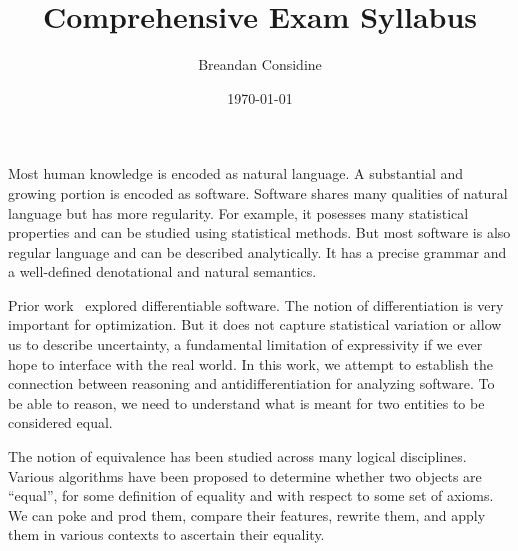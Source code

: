 \documentclass[11pt]{article}
\title{Comprehensive Exam Syllabus}
\author{Breandan Considine}
\date{\today}
\begin{document}
    \maketitle

    \tableofcontents
    \pagebreak

%

    Most human knowledge is encoded as natural language. A substantial and growing portion is encoded as software. Software shares many qualities of natural language but has more regularity. For example, it posesses many statistical properties and can be studied using statistical methods. But most software is also regular language and can be described analytically. It has a precise grammar and a well-defined denotational and natural semantics.

    Prior work~\citep{considine2019kotlingrad,considine2019programming} explored differentiable software. The notion of differentiation is very important for optimization. But it does not capture statistical variation or allow us to describe uncertainty, a fundamental limitation of expressivity if we ever hope to interface with the real world. In this work, we attempt to establish the connection between reasoning and antidifferentiation for analyzing software. To be able to reason, we need to understand what is meant for two entities to be considered equal.

    The notion of equivalence has been studied across many logical disciplines. Various algorithms have been proposed to determine whether two objects are ``equal'', for some definition of equality and with respect to some set of axioms. We can poke and prod them, compare their features, rewrite them, and apply them in various contexts to ascertain their equality.
\end{document}
